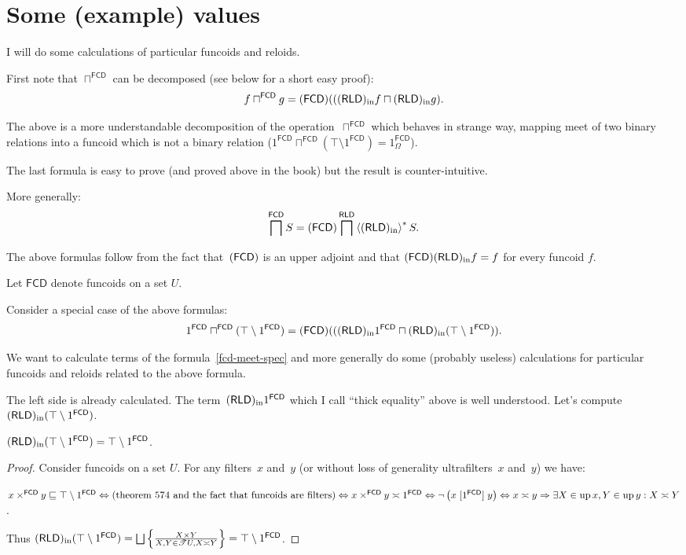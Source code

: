 \chapter{Some (example) values}

I will do some calculations of particular funcoids and reloids.

First note that $\sqcap^{\mathsf{FCD}}$ can be decomposed (see below for a short easy proof):
\[ f \sqcap^{\mathsf{FCD}} g = (\mathsf{FCD}) (((\mathsf{RLD})_{\mathrm{in}} f \sqcap (\mathsf{RLD})_{\mathrm{in}} g). \]

The above is a more understandable decomposition of the operation~$\sqcap^{\mathsf{FCD}}$
which behaves in strange way, mapping meet of two binary relations into a funcoid which
is not a binary relation ($1^{\mathsf{FCD}} \sqcap^{\mathsf{FCD}} (\top \setminus 1^{\mathsf{FCD}}) =
1^{\mathsf{FCD}}_{\Omega}$).

The last formula is easy to prove (and proved above in the book) but the result is counter-intuitive.

More generally:
\[ \bigsqcap^{\mathsf{FCD}} S = (\mathsf{FCD}) \bigsqcap^{\mathsf{RLD}} \left\langle (\mathsf{RLD})_{\mathrm{in}}\right\rangle ^{\ast} S. \]

The above formulas follow from the fact that~$(\mathsf{FCD})$ is an upper adjoint
and that $(\mathsf{FCD})(\mathsf{RLD})_{\mathrm{in}} f=f$ for every funcoid $f$.

Let $\mathsf{FCD}$ denote funcoids on a set $U$.

Consider a special case of the above formulas:
\begin{equation}\label{fcd-meet-spec}
1^{\mathsf{FCD}} \sqcap^{\mathsf{FCD}} (\top \setminus 1^{\mathsf{FCD}}) =
(\mathsf{FCD}) (((\mathsf{RLD})_{\mathrm{in}} 1^{\mathsf{FCD}} \sqcap (\mathsf{RLD})_{\mathrm{in}} (\top \setminus 1^{\mathsf{FCD}})).
\end{equation}

We want to calculate terms of the formula~\eqref{fcd-meet-spec} and more generally do some
(probably useless) calculations for particular funcoids and reloids related to the above formula.

The left side is already calculated. The term~$(\mathsf{RLD})_{\mathrm{in}} 1^{\mathsf{FCD}}$ which I call
``thick equality'' above is well understood. Let's compute $(\mathsf{RLD})_{\mathrm{in}} (\top \setminus 1^{\mathsf{FCD}})$.

\begin{prop}
$(\mathsf{RLD})_{\mathrm{in}} (\top \setminus 1^{\mathsf{FCD}}) = \top \setminus 1^{\mathsf{FCD}}$.
\end{prop}

\begin{proof}
Consider funcoids on a set $U$. For any filters~$x$ and~$y$ (or without loss of generality ultrafilters~$x$ and~$y$) we have:

$x \times^{\mathsf{FCD}} y \sqsubseteq \top \setminus
1^{\mathsf{FCD}} \Leftrightarrow \text{(theorem 574 and the fact that
funcoids are filters)} \Leftrightarrow x \times^{\mathsf{FCD}} y \asymp
1^{\mathsf{FCD}} \Leftrightarrow \neg \left( x
\mathrel{[1^{\mathsf{FCD}}]} y \right) \Leftrightarrow x \asymp y
\Rightarrow \exists X \in \operatorname{up} x, Y \in \operatorname{up} y : X \asymp Y$.

Thus $\torldin (\top \setminus
1^{\mathsf{FCD}}) = \bigsqcup \setcond{ X \times Y}
{X, Y \in \mathscr{T} U, X \asymp Y } = \top \setminus
1^{\mathsf{FCD}}$.
\end{proof}

